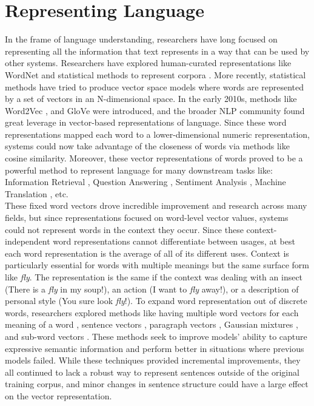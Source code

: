 \section{Representing Language}
\label{chap:intro:sec:lm}
In the frame of language understanding, researchers have long focused on representing all the information that text represents in a way that can be used by other systems. Researchers have explored human-curated representations like WordNet \cite{Miller1992WordNetAL}  and statistical methods to represent corpora \cite{Leacock1993TowardsBC}. More recently, statistical methods have tried to produce vector space models where words are represented by a set of vectors in an N-dimensional space. In the early 2010s, methods like Word2Vec \cite{Mikolov2013EfficientEO}, and GloVe \cite{Pennington2014GloveGV} were introduced, and the broader NLP community found great leverage in vector-based representations of language. Since these word representations mapped each word to a lower-dimensional numeric representation, systems could now take advantage of the closeness of words via methods like cosine similarity. Moreover, these vector representations of words proved to be a powerful method to represent language for many downstream tasks like: Information Retrieval \cite{Roy2018UsingWE}, Question Answering \cite{Othman2017AWE}, Sentiment Analysis \cite{Zhou2016ECNUAS}, Machine Translation \cite{Zou2013BilingualWE}, etc. \\
These fixed word vectors drove incredible improvement and research across many fields, but since representations focused on word-level vector values, systems could not represent words in the context they occur. Since these context-independent word representations cannot differentiate between usages, at best each word representation is the average of all of its different uses. Context is particularly essential for words with multiple meanings but the same surface form like \emph{fly}. The representation is the same if the context was dealing with an insect (There is a \emph{fly} in my soup!), an action (I want to \emph{fly} away!), or a description of personal style (You sure look \emph{fly}!). To expand word representation out of discrete words, researchers explored methods like having multiple word vectors for each meaning of a word \cite{Hu2016DifferentCL}, sentence vectors \cite{Kiros2015SkipThoughtV}, paragraph vectors \cite{Le2014DistributedRO}, Gaussian mixtures \cite{Athiwaratkun2017MultimodalWD}, and sub-word vectors \cite{Bojanowski2017EnrichingWV}. These methods seek to improve models' ability to capture expressive semantic information and perform better in situations where previous models failed. While these techniques provided incremental improvements, they all continued to lack a robust way to represent sentences outside of the original training corpus, and minor changes in sentence structure could have a large effect on the vector representation. \\ 

